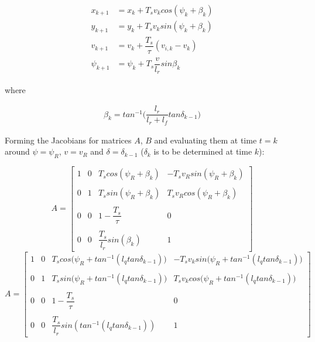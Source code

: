 \begin{align}
  x_{k+1} &= x_{k} + T_s v_k cos(\psi_k + \beta_k) \\
  y_{k+1} &= y_{k} + T_s v_k sin(\psi_k + \beta_k) \\
  v_{k+1} &= v_{k} + \dfrac{T_s}{\tau} (v_{i,k} - v_{k}) \\
  \psi_{k+1} &= \psi_{k} + T_s \dfrac{v}{l_r} sin\beta_k
\end{align}

where

\begin{align}
  \beta_k = tan^{-1}\Big(\dfrac{l_r}{l_r + l_f} tan\delta_{k-1}\Big)
\end{align}


Forming the Jacobians for matrices $A$, $B$ and evaluating them at time
$t=k$ around $\psi = \psi_R$, $v = v_R$ and $\delta = \delta_{k-1}$
($\delta_k$ is to be determined at time $k$):

\begin{equation}
 A =
  \begin{bmatrix}
    1 & 0 & T_s cos(\psi_R + \beta_k) & -T_s v_R sin(\psi_R + \beta_k) \\\\
    0 & 1 & T_s sin(\psi_R + \beta_k) & T_s v_R cos(\psi_R + \beta_k) \\\\
    0 & 0 & 1-\dfrac{T_s}{\tau} & 0 \\\\
    0 & 0 & \dfrac{T_s}{l_r}sin(\beta_k) & 1
  \end{bmatrix}
\end{equation}
\begin{equation}
  A =
  \begin{bmatrix}
    1 & 0 & T_s cos\Big(\psi_R + tan^{-1} (l_q tan\delta_{k-1})\Big) & -T_s v_k sin\Big(\psi_R + tan^{-1} (l_q tan\delta_{k-1})\Big) \\\\
    0 & 1 & T_s sin\Big(\psi_R + tan^{-1} (l_q tan\delta_{k-1})\Big) & T_s v_k cos\Big(\psi_R + tan^{-1} (l_q tan\delta_{k-1})\Big) \\\\
    0 & 0 & 1-\dfrac{T_s}{\tau} & 0 \\\\
    0 & 0 & \dfrac{T_s}{l_r}sin(tan^{-1} (l_q tan\delta_{k-1})) & 1
  \end{bmatrix}
\end{equation}


